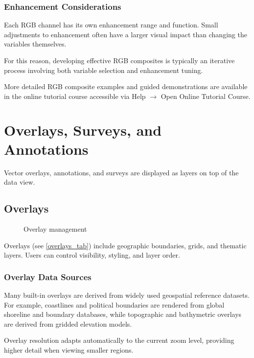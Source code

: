 \subsubsection*{Enhancement Considerations}

Each RGB channel has its own enhancement range and function. Small
adjustments to enhancement often have a larger visual impact than
changing the variables themselves.

For this reason, developing effective RGB composites is typically an
iterative process involving both variable selection and enhancement
tuning.

More detailed RGB composite examples and guided demonstrations are
available in the online tutorial course accessible via
{\gui Help \(\rightarrow\) Open Online Tutorial Course}.

\section{Overlays, Surveys, and Annotations}

Vector overlays, annotations, and surveys are displayed as layers on top
of the data view.

\subsection{Overlays}

\begin{figure}
  \begin{center}
    \caption{Overlay management}
    \label{overlays_tab}
  \end{center}
\end{figure}

Overlays (see \autoref{overlays_tab}) include geographic boundaries, grids, and thematic layers.
Users can control visibility, styling, and layer order.

\subsubsection*{Overlay Data Sources}

Many built-in overlays are derived from widely used geospatial
reference datasets. For example, coastlines and political boundaries
are rendered from global shoreline and boundary databases, while
topographic and bathymetric overlays are derived from gridded elevation
models.  

Overlay resolution adapts automatically to the current zoom level,
providing higher detail when viewing smaller regions.

